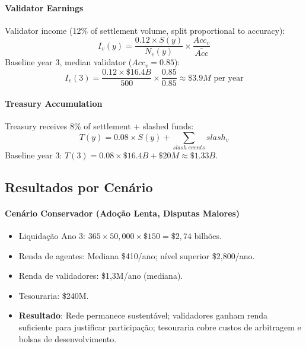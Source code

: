 \documentclass[11pt]{article}
\begin{document}
\begin{itemize}[noitemsep]
\begin{itemize}[noitemsep]
\begin{itemize}[noitemsep]
\paragraph{Validator Earnings} Validator income (12\% of settlement volume, split proportional to accuracy):
\begin{equation}
I_v(y) = \frac{0.12 \times S(y)}{N_v(y)} \times \frac{Acc_v}{\bar{Acc}}
\end{equation}
Baseline year 3, median validator ($Acc_v = 0.85$):
\begin{equation}
I_v(3) = \frac{0.12 \times \$16.4B}{500} \times \frac{0.85}{0.85} \approx \$3.9M \text{ per year}
\end{equation}

\paragraph{Treasury Accumulation} Treasury receives 8\% of settlement + slashed funds:
\begin{equation}
T(y) = 0.08 \times S(y) + \sum_{slash \; events} slash_v
\end{equation}
Baseline year 3: $T(3) = 0.08 \times \$16.4B + \$20M \approx \$1.33B$.

\subsection{Resultados por Cenário}
\paragraph{Cenário Conservador (Adoção Lenta, Disputas Maiores)}
\begin{itemize}[noitemsep]
  \item Liquidação Ano 3: $365 \times 50{,}000 \times \$150 = \$2,74$ bilhões.
  \item Renda de agentes: Mediana \$410/ano; nível superior \$2{,}800/ano.
  \item Renda de validadores: \$1,3M/ano (mediana).
  \item Tesouraria: \$240M.
  \item \textbf{Resultado}: Rede permanece sustentável; validadores ganham renda suficiente para justificar participação; tesouraria cobre custos de arbitragem e bolsas de desenvolvimento.
\end{itemize}


\end{itemize}
\end{itemize}
\end{itemize}
\end{document}

